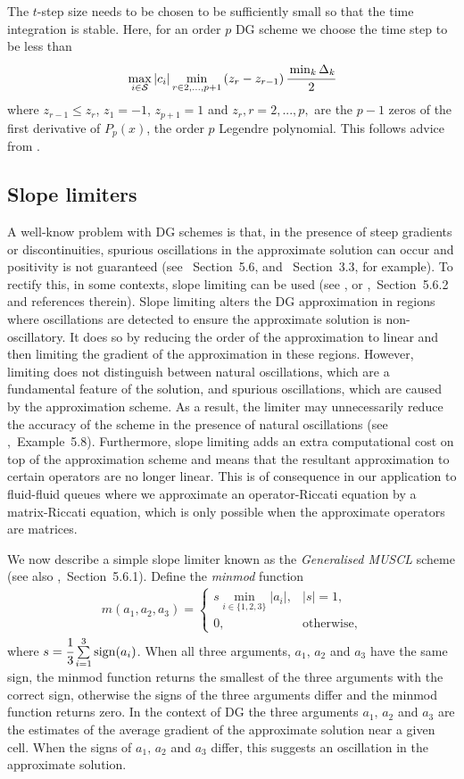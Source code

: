 The \(t\)-step size needs to be chosen to be sufficiently small so that the time integration is stable. Here, for an order \(p\) DG scheme we choose the time step to be less than 
\[\max_{i\in\mathcal{S}}|c_i|\min_{r\in{2,...,p+1}}\left(z_{r}-z_{r-1}\right) \cfrac{\min_{k}{\Delta}_k}{2}\]
where \(z_{r-1}\leq z_r\), \(z_1=-1\), \(z_{p+1}=1\) and \(z_r, r=2,...,p,\) are the \(p-1\) zeros of the first derivative of \(P_{p}(x)\), the order \(p\) Legendre polynomial. This follows advice from \cite{nodalDGBook}. 

\subsection{Slope limiters}\label{sec: slope limiting}
A well-know problem with DG schemes is that, in the presence of steep gradients or discontinuities, spurious oscillations in the approximate solution can occur and positivity is not guaranteed (see \cite{nodalDGBook}~Section~5.6, and \cite{koltai2011}~Section~3.3, for example). To rectify this, in some contexts, slope limiting can be used (see \cite{c99}, or \cite{nodalDGBook},~Section~5.6.2 and references therein). Slope limiting alters the DG approximation in regions where oscillations are detected to ensure the approximate solution is non-oscillatory. It does so by reducing the order of the approximation to linear and then limiting the gradient of the approximation in these regions. However, limiting does not distinguish between natural oscillations, which are a fundamental feature of the solution, and spurious oscillations, which are caused by the approximation scheme. As a result, the limiter may unnecessarily reduce the accuracy of the scheme in the presence of natural oscillations (see \citep{nodalDGBook},~Example~5.8). Furthermore, slope limiting adds an extra computational cost on top of the approximation scheme and means that the resultant approximation to certain operators are no longer linear. This is of consequence in our application to fluid-fluid queues where we approximate an operator-Riccati equation by a matrix-Riccati equation, which is only possible when the approximate operators are matrices. 

We now describe a simple slope limiter known as the \emph{Generalised MUSCL} scheme \citep{c99} (see also \citep{nodalDGBook},~Section~5.6.1). Define the \emph{minmod} function 
\begin{align*}
	m(a_1,a_2,a_3)=\begin{cases}
		s\min_{i\in\{1,2,3\}}|a_i|, & |s|=1, \\
		0, &\mbox{otherwise},
	\end{cases}
\end{align*}
where \(s=\cfrac{1}{3}\sum\limits_{i=1}^{3}\mathrm{sign}(a_i)\). When all three arguments, \(a_1,\,a_2\) and \(a_3\) have the same sign, the minmod function returns the smallest of the three arguments with the correct sign, otherwise the signs of the three arguments differ and the minmod function returns zero. In the context of DG the three arguments \(a_1,\,a_2\) and \(a_3\) are the estimates of the average gradient of the approximate solution near a given cell. When the signs of \(a_1,\,a_2\) and \(a_3\) differ, this suggests an oscillation in the approximate solution. 

